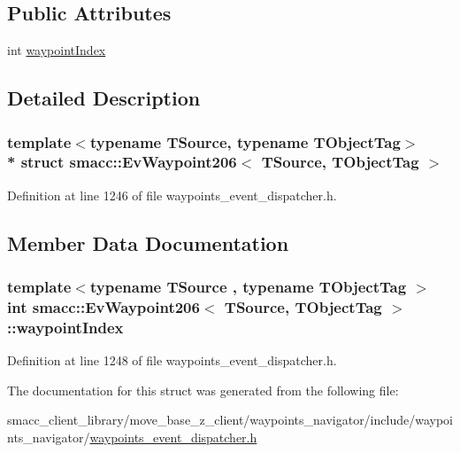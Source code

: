 \subsection*{Public Attributes}
\begin{DoxyCompactItemize}
\item 
int \hyperlink{structsmacc_1_1EvWaypoint206_a272477d1c64bd3a9e58201d3d1f9fab3}{waypoint\+Index}
\end{DoxyCompactItemize}


\subsection{Detailed Description}
\subsubsection*{template$<$typename T\+Source, typename T\+Object\+Tag$>$\\*
struct smacc\+::\+Ev\+Waypoint206$<$ T\+Source, T\+Object\+Tag $>$}



Definition at line 1246 of file waypoints\+\_\+event\+\_\+dispatcher.\+h.



\subsection{Member Data Documentation}
\subsubsection[{\texorpdfstring{waypoint\+Index}{waypointIndex}}]{\setlength{\rightskip}{0pt plus 5cm}template$<$typename T\+Source , typename T\+Object\+Tag $>$ int {\bf smacc\+::\+Ev\+Waypoint206}$<$ T\+Source, T\+Object\+Tag $>$\+::waypoint\+Index}\hypertarget{structsmacc_1_1EvWaypoint206_a272477d1c64bd3a9e58201d3d1f9fab3}{}\label{structsmacc_1_1EvWaypoint206_a272477d1c64bd3a9e58201d3d1f9fab3}


Definition at line 1248 of file waypoints\+\_\+event\+\_\+dispatcher.\+h.



The documentation for this struct was generated from the following file\+:\begin{DoxyCompactItemize}
\item 
smacc\+\_\+client\+\_\+library/move\+\_\+base\+\_\+z\+\_\+client/waypoints\+\_\+navigator/include/waypoints\+\_\+navigator/\hyperlink{waypoints__event__dispatcher_8h}{waypoints\+\_\+event\+\_\+dispatcher.\+h}\end{DoxyCompactItemize}

